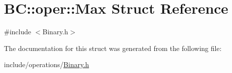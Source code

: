 \hypertarget{structBC_1_1oper_1_1Max}{}\section{BC\+:\+:oper\+:\+:Max Struct Reference}
\label{structBC_1_1oper_1_1Max}


{\ttfamily \#include $<$Binary.\+h$>$}



The documentation for this struct was generated from the following file\+:\begin{DoxyCompactItemize}
\item 
include/operations/\hyperlink{Binary_8h}{Binary.\+h}\end{DoxyCompactItemize}
